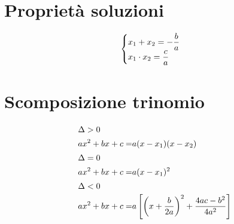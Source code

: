 \section{Proprietà soluzioni}
\begin{equation*}
\begin{cases}
x_1+x_2=-\dfrac{b}{a}\\
x_1\cdot x_2=\dfrac{c}{a}
\end{cases}\index{Equazione!secondo grado!somma soluzioni}\index{Equazione!secondo grado!prodotto soluzioni}
\end{equation*}
\section{Scomposizione trinomio}
\begin{align*}
\intertext{$\Delta>0$}
ax^2+bx+c=&a(x-x_1)(x-x_2)\\
\intertext{$\Delta=0$}
ax^2+bx+c=&a(x-x_1)^2\\
\intertext{$\Delta<0$}
ax^2+bx+c=&a\left[\left(x+\dfrac{b}{2a}\right)^2+\dfrac{4ac-b^2}{4a^2}\right]
\end{align*}